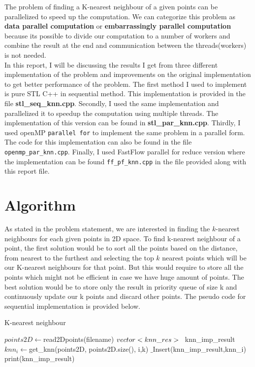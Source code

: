 \documentclass[12pt,a4paper]{report}
\begin{document}
The problem of finding a K-nearest neighbour of a given points can be parallelized to speed up the computation. We can categorize this problem as \textbf{data parallel computation} or \textbf{embarrassingly parallel computation} because its possible to divide our computation to a number of workers and combine the result at the end and communication between the threads(workers) is not needed. \\

In this report, I will be discussing the results I get from three different implementation of the problem and improvements on the original implementation to get better performance of the problem. The first method I used to implement is pure STL C++ in sequential method. This implementation is provided in the file \textbf{stl\_seq\_knn.cpp}. Secondly, I used the same implementation and parallelized it to speedup the computation using multiple threads. The implementation of this version can be found in \textbf{stl\_par\_knn.cpp}. Thirdly, I used openMP \verb!parallel for! to implement the same problem in a parallel form. The code for this implementation can also be found in the file \verb!openmp_par_knn.cpp!. Finally, I used FastFlow parallel for reduce version where the implementation can be found \verb!ff_pf_knn.cpp! in the file provided along with this report file.

\section{Algorithm}
As stated in the problem statement, we are interested in finding the $k$-nearest neighbours for each given points in 2D space. To find k-nearest neighbour of a point, the first solution would be to sort all the points based on the distance, from nearest to the furthest and selecting the top $k$ nearest points which will be our K-nearest neighbours for that point. But this would require to store all the points which might not be efficient in case we have huge amount of points. The best solution would be to store only the result in priority queue of size k and continuously update our k points and discard other points. The pseudo code for sequential implementation is provided below.

\begin{algorithm}
	\caption{K-nearest neighbour} 
	\begin{algorithmic}[1]
	    \State $points2D \gets $read2Dpoints(filename)
	    \State $vector<knn\_res> \hspace{0.3cm} $knn\_imp\_result    
			\State $knn_{i} \gets $get\_knn(points2D, points2D.size(), i,k)
			\State ${\_} $Insert(knn\_imp\_result,knn\_{i})
		\EndFor
	\State print(knn\_imp\_result)
	\end{algorithmic}
	\label{knn:alg}
\end{algorithm}
\end{document}
